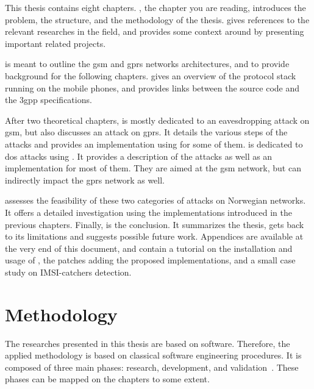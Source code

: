     This thesis contains eight chapters. , the
    chapter you are reading, introduces the problem, the structure, and
    the methodology of the thesis.  gives
    references to the relevant researches in the field, and provides
    some context around  by presenting important related
    projects.

     is meant to outline the \gls{gsm}
    and \gls{gprs} networks architectures, and to provide background for
    the following chapters. 
    gives an overview of the protocol stack running on the mobile
    phones, and provides links between the  source code
    and the \gls{3gpp} specifications.

    After two theoretical chapters,  is
    mostly dedicated to an eavesdropping attack on \gls{gsm}, but also
    discusses an attack on \gls{gprs}. It details the various steps of
    the attacks and provides an implementation using 
    for some of them.  is dedicated to \gls{dos}
    attacks using . It provides a description of the
    attacks as well as an implementation for most of them. They are
    aimed at the \gls{gsm} network, but can indirectly impact the
    \gls{gprs} network as well.

     assesses
    the feasibility of these two categories of attacks on Norwegian
    networks. It offers a detailed investigation using the
    implementations introduced in the previous chapters. Finally,
     is the conclusion. It summarizes the thesis,
    gets back to its limitations and suggests possible future work.
    Appendices are available at the very end of this document, and
    contain a tutorial on the installation and usage of
    , the patches adding the proposed implementations,
    and a small case study on IMSI-catchers detection.

  \section{Methodology}

    The researches presented in this thesis are based on software.
    Therefore, the applied methodology is based on classical software
    engineering procedures. It is composed of three main phases:
    research, development, and
    validation~\cite{sommerville_software_2007}. These phases can be
    mapped on the chapters to some extent.

